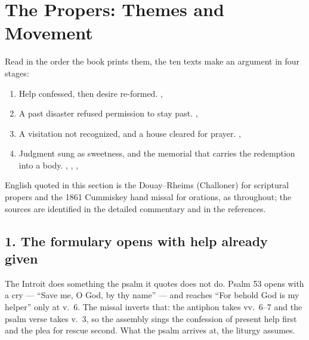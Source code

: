 \sectionguard
\section*{The Propers: Themes and Movement}
\label{triptych:brief-synthesis:start}


Read in the order the book prints them, the ten texts make an argument in four
stages:

\begin{enumerate}[leftmargin=1.5em, itemsep=0.1em]
  \item Help confessed, then desire re-formed. , 
  \item A past disaster refused permission to stay past. , 
  \item A visitation not recognized, and a house cleared for prayer. , 
  \item Judgment sung as sweetness, and the memorial that carries the redemption into a body. , , , 
\end{enumerate}

English quoted in this section is the Douay--Rheims (Challoner) for scriptural
propers and the 1861 Cummiskey hand missal for orations, as throughout;
the sources are identified in the detailed commentary and in the references.

\subsection*{1. The formulary opens with help already given}

The Introit does something the psalm it quotes does not do. Psalm 53 opens
with a cry --- ``Save me, O God, by thy name'' --- and reaches ``For behold
God is my helper'' only at v.~6. The missal inverts that: the antiphon takes
vv.~6--7 and the psalm verse takes v.~3, so the assembly sings the confession
of present help first and the plea for rescue second. What the psalm arrives
at, the liturgy assumes.

